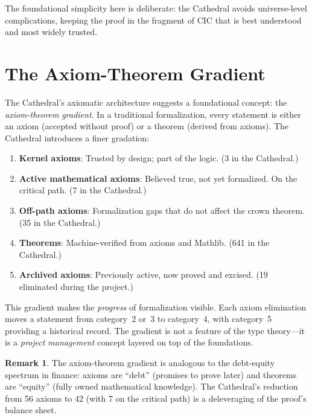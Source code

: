 \documentclass[11pt,a4paper]{article}
\theoremstyle{plain}
\theoremstyle{definition}
\newtheorem{remark}[theorem]{Remark}
\begin{document}
The foundational simplicity here is deliberate: the Cathedral avoids
universe-level complications, keeping the proof in the fragment of
CIC that is best understood and most widely trusted.

\section{The Axiom-Theorem Gradient}
\label{sec:gradient}

The Cathedral's axiomatic architecture suggests a foundational
concept: the \emph{axiom-theorem gradient}. In a traditional
formalization, every statement is either an axiom (accepted without
proof) or a theorem (derived from axioms). The Cathedral introduces
a finer gradation:

\begin{enumerate}
  \item \textbf{Kernel axioms}: Trusted by design; part of the logic.
    (3 in the Cathedral.)
  \item \textbf{Active mathematical axioms}: Believed true, not yet
    formalized. On the critical path. (7 in the Cathedral.)
  \item \textbf{Off-path axioms}: Formalization gaps that do not
    affect the crown theorem. (35 in the Cathedral.)
  \item \textbf{Theorems}: Machine-verified from axioms and Mathlib.
    (641 in the Cathedral.)
  \item \textbf{Archived axioms}: Previously active, now proved and
    excised. (19 eliminated during the project.)
\end{enumerate}

This gradient makes the \emph{progress} of formalization visible.
Each axiom elimination moves a statement from category~2 or~3 to
category~4, with category~5 providing a historical record. The
gradient is not a feature of the type theory---it is a \emph{project
management} concept layered on top of the foundations.

\begin{remark}
The axiom-theorem gradient is analogous to the debt-equity spectrum
in finance: axioms are ``debt'' (promises to prove later) and theorems
are ``equity'' (fully owned mathematical knowledge). The Cathedral's
reduction from 56 axioms to 42 (with 7 on the critical path) is a
deleveraging of the proof's balance sheet.
\end{remark}
\end{document}
